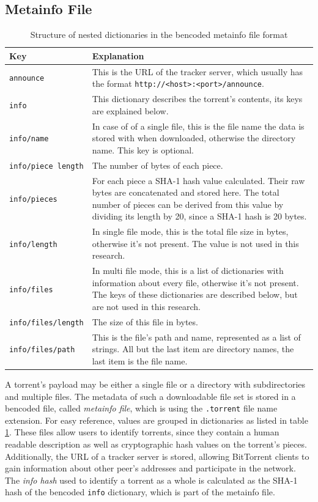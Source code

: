 \documentclass[10pt, a4paper, twoside, headsepline]{scrbook}
\renewcommand{\_}{\origunderscore\allowbreak}
\begin{document}
\subsection{Metainfo File}
\begin{table}
\centering
\begin{tabularx}{\textwidth}{lX}
\toprule
Key & Explanation \\
\midrule
\texttt{announce} & This is the URL of the tracker server, which usually has the format \nolinkurl{http://<host>:<port>/announce}. \\
\texttt{info} & This dictionary describes the torrent's contents, its keys are explained below. \\
\texttt{info/name} & In case of of a single file, this is the file name the data is stored with when downloaded, otherwise the directory name. This key is optional. \\
\texttt{info/piece length} & The number of bytes of each piece. \\
\texttt{info/pieces} & For each piece a SHA-1 hash value calculated. Their raw bytes are concatenated and stored here. The total number of pieces can be derived from this value by dividing its length by 20, since a SHA-1 hash is 20 bytes. \\
\texttt{info/length} & In single file mode, this is the total file size in bytes, otherwise it's not present. The value is not used in this research. \\
\texttt{info/files} & In multi file mode, this is a list of dictionaries with information about every file, otherwise it's not present. The keys of these dictionaries are described below, but are not used in this research. \\
\texttt{info/files/length} & The size of this file in bytes. \\
\texttt{info/files/path} & This is the file's path and name, represented as a list of strings. All but the last item are directory names, the last item is the file name. \\
\bottomrule
\end{tabularx}
\caption{Structure of nested dictionaries in the bencoded metainfo file format}
\label{metainfo-file}
\end{table}

A torrent's payload may be either a single file or a directory with subdirectories and multiple files. The metadata of such a downloadable file set is stored in a bencoded file, called \emph{metainfo file}, which is using the \texttt{.torrent} file name extension. For easy reference, values are grouped in dictionaries as listed in table \ref{metainfo-file}. These files allow users to identify torrents, since they contain a human readable description as well as cryptographic hash values on the torrent's pieces. Additionally, the URL of a tracker server is stored, allowing BitTorrent clients to gain information about other peer's addresses and participate in the network. The \emph{info hash} used to identify a torrent as a whole is calculated as the SHA-1 hash of the bencoded \texttt{info} dictionary, which is part of the metainfo file.
\end{document}
